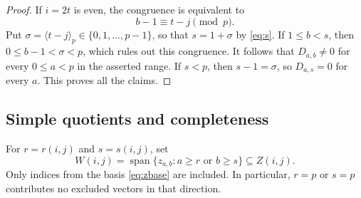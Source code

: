\documentclass[10pt,oneside]{amsart}
\newcommand{\res}[1]{\langle #1\rangle_p}
\newcommand{\Span}{\operatorname{span}}
\theoremstyle{definition}
\begin{document}
\begin{proof}
If $i=2t$ is even, the congruence is equivalent to
\[
 b-1\equiv t-j\pmod p.
\]
Put $\sigma=\res{t-j}\in\{0,1,\ldots,p-1\}$, so that
$s=1+\sigma$ by \eqref{eq:s}. If $1\le b<s$, then
$0\le b-1<\sigma<p$, which rules out this congruence.
It follows that $D_{a,b}\ne0$ for every $0\le a<p$ in the asserted
range. If $s<p$, then $s-1=\sigma$, so $D_{a,s}=0$ for every $a$.
This proves all the claims.
\end{proof}

\subsection{Simple quotients and completeness}
For $r=r(i,j)$ and $s=s(i,j)$, set
\begin{equation}
 W(i,j)=\Span\{z_{a,b}:a\ge r\text{ or }b\ge s\}\subseteq Z(i,j).
 \label{eq:W}
\end{equation}
Only indices from the basis \eqref{eq:zbase} are included. In particular, $r=p$ or $s=p$ contributes no excluded vectors in that direction.
\end{document}
